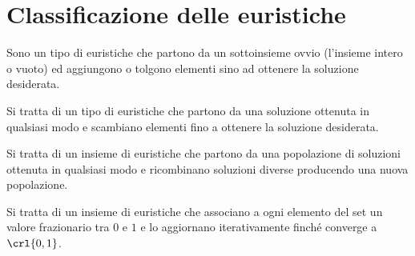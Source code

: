 \documentclass[\main/main.tex]{subfiles}
\begin{document}
\section{Classificazione delle euristiche}
\begin{multicols}{2}
  \begin{observation}
    Sono un tipo di euristiche che partono da un sottoinsieme ovvio (l'insieme intero o vuoto) ed aggiungono o tolgono elementi sino ad ottenere la soluzione desiderata.
  \end{observation}
  \begin{observation}
    Si tratta di un tipo di euristiche che partono da una soluzione ottenuta in qualsiasi modo e scambiano elementi fino a ottenere la soluzione desiderata.
  \end{observation}
  \begin{observation}
    Si tratta di un insieme di euristiche che partono da una popolazione di soluzioni ottenuta in qualsiasi modo e ricombinano soluzioni diverse producendo una nuova popolazione.
  \end{observation}
  \begin{observation}
    Si tratta di un insieme di euristiche che associano a ogni elemento del set un valore frazionario tra \(0\) e \(1\) e lo aggiornano iterativamente finché converge a \(\crl{0, 1}\).
    \end{observation}
\end{multicols}
\end{document}
